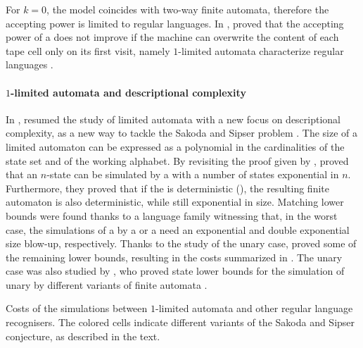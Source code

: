For $k=0$, the model coincides with two-way finite automata, therefore the accepting power is limited to regular languages.
In \citeyear{WagWec86}, \citeauthor{WagWec86} proved that the accepting power of a \TNFA does not improve if the machine can overwrite the content of each tape cell only on its first visit, namely $1$-limited automata characterize regular languages \cite{WagWec86}.

\paragraph{$1$-limited automata and descriptional complexity}
In \citeyear{PigPis14}, \citeauthor{PigPis14} resumed the study of limited automata with a new focus on descriptional complexity, as a new way to tackle the Sakoda and Sipser problem \cite{PigPis14}.
The size of a limited automaton can be expressed as a polynomial in the cardinalities of the state set and of the working alphabet.
By revisiting the proof given by \citeauthor{WagWec86}, \citeauthor{PigPis14} proved that an $n$-state \OLA can be simulated by a \ONFA with a number of states exponential in $n$.
Furthermore, they proved that if the \OLA is deterministic (\ODLA), the resulting finite automaton is also deterministic, while still exponential in size.
Matching lower bounds were found thanks to a language family witnessing that, in the worst case, the simulations of a \OLA by a \ONFA or a \ODFA need an exponential and double exponential size blow-up, respectively.
Thanks to the study of the unary case, \citeauthor{PigPri19} proved some of the remaining lower bounds, resulting in the costs summarized in  \cite{PigPri19}.
The unary case was also studied by \citeauthor{KutWen15}, who proved state lower bounds for the simulation of unary \kLA by different variants of finite automata \cite{KutWen15}.

\begin{table}
	\centering
	\caption[Costs of the simulations between $1$-limited automata and other regular language recognisers.]{Costs of the simulations between $1$-limited automata and other regular language recognisers.
		The colored cells indicate different variants of the Sakoda and Sipser conjecture, as described in the text.}
	\label{tab:sims-1la-general-context}
\end{table}


